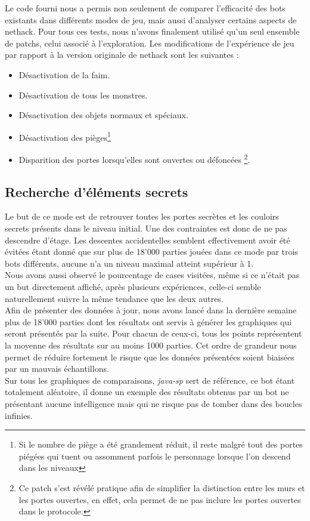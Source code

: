 \documentclass[a4paper,12pt]{article}
\begin{document}
Le code fourni nous a permis non seulement de comparer l'efficacité des bots
existants dans différents modes de jeu, mais aussi d'analyser certains aspects
de nethack. Pour tous ces tests, nous n'avons finalement utilisé qu'un seul
ensemble de patchs, celui associé à l'exploration. Les modifications de
l'expérience de jeu par rapport à la version originale de nethack sont les
suivantes :

\begin{itemize}
\item Désactivation de la faim.
\item Désactivation de tous les monstres.
\item Désactivation des objets normaux et spéciaux.
\item Désactivation des pièges\footnote{Si le nombre de piège a été grandement
  réduit, il reste malgré tout des portes piégées qui tuent ou assomment parfois
  le personnage lorsque l'on descend dans les niveaux}
\item Disparition des portes lorsqu'elles sont ouvertes ou défoncées
  \footnote{Ce patch s'est révélé pratique afin de simplifier la distinction
    entre les murs et les portes ouvertes, en effet, cela permet de ne pas
    inclure les portes ouvertes dans le protocole.}.
\end{itemize}

\subsection{Recherche d'éléments secrets}
Le but de ce mode est de retrouver toutes les portes secrètes et les couloirs
secrets présents dans le niveau initial. Une des contraintes est donc de ne pas
descendre d'étage. Les descentes accidentelles semblent effectivement avoir été
évitées étant donné que sur plus de 18'000 parties jouées dans ce mode par trois
bots différents, aucune n'a un niveau maximal atteint supérieur à 1.
\\
Nous avons aussi observé le pourcentage de cases visitées, même si ce n'était
pas un but directement affiché, après plusieurs expériences, celle-ci semble
naturellement suivre la même tendance que les deux autres.
\\
Afin de présenter des données à jour, nous avons lancé dans la dernière semaine
plus de 18'000 parties dont les résultats ont servis à générer les graphiques
qui seront présentés par la suite. Pour chacun de ceux-ci, tous les points
représentent la moyenne des résultats sur au moins 1000 parties. Cet ordre de
grandeur nous permet de réduire fortement le risque que les données présentées
soient biaisées par un mauvais échantillons.
\\
Sur tous les graphiques de comparaisons, {\em java-sp} sert de référence, ce bot
étant totalement aléatoire, il donne un exemple des résultats obtenus par un bot
ne présentant aucune intelligence mais qui ne risque pas de tomber dans des
boucles infinies.
\end{document}
